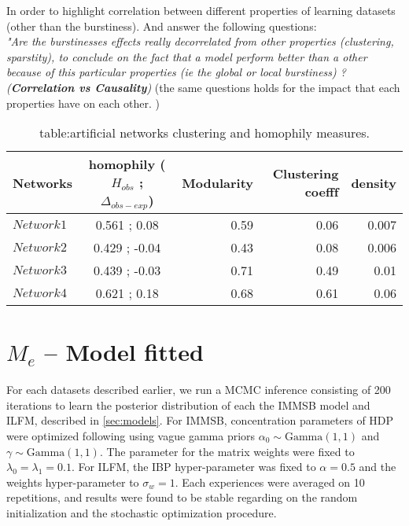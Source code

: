 \documentclass[a4paper, 12pt]{article}
\begin{document}
In order to highlight correlation between different properties of learning datasets (other than the burstiness). And answer the following questions: ~\\

\hspace{1cm}\textit{"Are the burstinesses effects really decorrelated from other properties (clustering, sparstity), to conclude on the fact that a model perform better than a other because of this particular properties (ie the global or local burstiness) ? (\textbf{Correlation \emph{vs} Causality}) } (the same questions holds for the impact that each properties have on each other. ) 

\begin{table}[h] \label{table:artificial_networks_hom}
\centering
	\caption{table:artificial networks clustering and homophily measures.}
	\begin{tabular}{lcrrr}
		\hline
		Networks   &  homophily ($H_ {obs}$ ; $\Delta_{obs - exp}$)    &  Modularity & Clustering coefff & density   \\
		\hline
		$Network1$  & 0.561 ;  0.08  &0.59  & 0.06 & 0.007  \\
		$Network2$  & 0.429 ; -0.04  &0.43  & 0.08 & 0.006 \\
		$Network3$  & 0.439 ; -0.03  &0.71  & 0.49 & 0.01 \\
		$Network4$  & 0.621 ;  0.18  &0.68  & 0.61 & 0.06 \\
		\hline
	\end{tabular}
\end{table}

\section{$M_e$ -- Model fitted}

For each datasets described earlier, we run a MCMC inference consisting of 200 iterations to learn the posterior distribution of each the IMMSB model and ILFM, described in \ref{sec:models}. For IMMSB, concentration parameters of HDP were optimized following \cite{HDP} using vague gamma priors $\alpha_0 \sim \text{Gamma}(1,1)$ and $\gamma \sim \text{Gamma}(1,1)$. The parameter for the matrix weights were fixed to $\lambda_0=\lambda_1=0.1$. For ILFM, the IBP hyper-parameter was fixed to $\alpha=0.5$ and the weights hyper-parameter to $\sigma_w = 1$. Each experiences were averaged on 10 repetitions, and results were found to be stable regarding on the random  initialization and the stochastic optimization procedure. 
 
\end{document}
